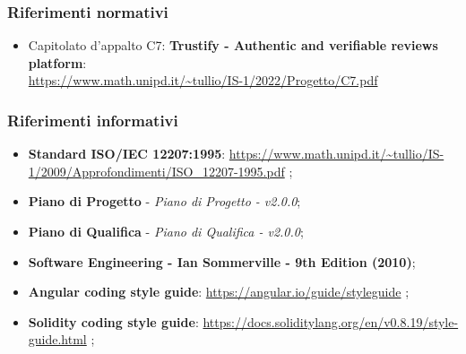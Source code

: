 \subsubsection{Riferimenti normativi}
\begin{itemize}
    \item Capitolato d'appalto C7: \textbf{Trustify - Authentic and verifiable reviews platform}: \\
          \url{https://www.math.unipd.it/~tullio/IS-1/2022/Progetto/C7.pdf}
          \hfill{}%
\end{itemize}
\subsubsection{Riferimenti informativi}
\begin{itemize}
    \item \textbf{Standard ISO/IEC 12207:1995}: \url{https://www.math.unipd.it/~tullio/IS-1/2009/Approfondimenti/ISO_12207-1995.pdf} \hfill{}; %
    \item \textbf{Piano di Progetto} - \textit{Piano di Progetto - v2.0.0};
    \item \textbf{Piano di Qualifica} - \textit{Piano di Qualifica - v2.0.0};
    \item \textbf{Software Engineering - Ian Sommerville - 9th Edition (2010)};
    \item \textbf{Angular coding style guide}: \url{https://angular.io/guide/styleguide} \hfill{}; %
    \item \textbf{Solidity coding style guide}: \url{https://docs.soliditylang.org/en/v0.8.19/style-guide.html} \hfill{}; %
\end{itemize}
